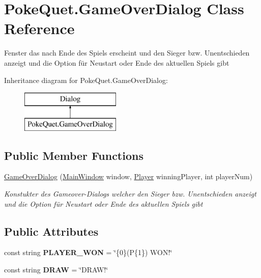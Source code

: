 \hypertarget{class_poke_quet_1_1_game_over_dialog}{}\section{Poke\+Quet.\+Game\+Over\+Dialog Class Reference}
\label{class_poke_quet_1_1_game_over_dialog}


Fenster das nach Ende des Spiels erscheint und den Sieger bzw. Unentschieden anzeigt und die Option für Neustart oder Ende des aktuellen Spiels gibt  


Inheritance diagram for Poke\+Quet.\+Game\+Over\+Dialog\+:\begin{figure}[H]
\begin{center}
\leavevmode
\includegraphics[height=2.000000cm]{class_poke_quet_1_1_game_over_dialog}
\end{center}
\end{figure}
\subsection*{Public Member Functions}
\begin{DoxyCompactItemize}
\item 
\mbox{\hyperlink{class_poke_quet_1_1_game_over_dialog_a8c93fc8093ac6012aa11d16bac7be605}{Game\+Over\+Dialog}} (\mbox{\hyperlink{class_main_window}{Main\+Window}} window, \mbox{\hyperlink{class_poke_quet_1_1_player}{Player}} winning\+Player, int player\+Num)
\begin{DoxyCompactList}\small\item\em Konstukter des Gameover-\/\+Dialogs welcher den Sieger bzw. Unentschieden anzeigt und die Option für Neustart oder Ende des aktuellen Spiels gibt \end{DoxyCompactList}\end{DoxyCompactItemize}
\subsection*{Public Attributes}
\begin{DoxyCompactItemize}
\item 
\mbox{\label{class_poke_quet_1_1_game_over_dialog_a3da51964f7f1a7de547eae90f781429b}} 
const string {\bfseries P\+L\+A\+Y\+E\+R\+\_\+\+W\+ON} = \char`\"{}\{0\}(P\{1\}) W\+O\+N!\char`\"{}
\item 
\mbox{\label{class_poke_quet_1_1_game_over_dialog_aa4ac065867974d1cabdf0b0fd8137a0a}} 
const string {\bfseries D\+R\+AW} = \char`\"{}D\+R\+A\+W!\char`\"{}
\end{DoxyCompactItemize}

